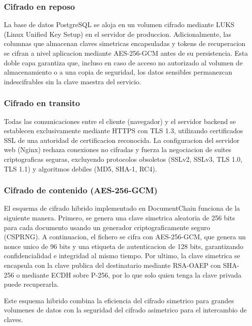 \documentclass[11pt, a4paper]{article}
\begin{document}
\subsubsection{Cifrado en reposo}

La base de datos PostgreSQL se aloja en un volumen cifrado mediante LUKS (Linux Unified Key Setup) en el servidor de produccion. Adicionalmente, las columnas que almacenan claves simetricas encapsuladas y tokens de recuperacion se cifran a nivel aplicacion mediante AES-256-GCM antes de su persistencia. Esta doble capa garantiza que, incluso en caso de acceso no autorizado al volumen de almacenamiento o a una copia de seguridad, los datos sensibles permanezcan indescifrables sin la clave maestra del servicio.

\subsubsection{Cifrado en transito}

Todas las comunicaciones entre el cliente (navegador) y el servidor backend se establecen exclusivamente mediante HTTPS con TLS 1.3, utilizando certificados SSL de una autoridad de certificacion reconocida. La configuracion del servidor web (Nginx) rechaza conexiones no cifradas y fuerza la negociacion de suites criptograficas seguras, excluyendo protocolos obsoletos (SSLv2, SSLv3, TLS 1.0, TLS 1.1) y algoritmos debiles (MD5, SHA-1, RC4).

\subsubsection{Cifrado de contenido (AES-256-GCM)}

El esquema de cifrado hibrido implementado en DocumentChain funciona de la siguiente manera. Primero, se genera una clave simetrica aleatoria de 256 bits para cada documento usando un generador criptograficamente seguro (CSPRNG). A continuacion, el fichero se cifra con AES-256-GCM, que genera un nonce unico de 96 bits y una etiqueta de autenticacion de 128 bits, garantizando confidencialidad e integridad al mismo tiempo. Por ultimo, la clave simetrica se encapsula con la clave publica del destinatario mediante RSA-OAEP con SHA-256 o mediante ECDH sobre P-256, por lo que solo quien tenga la clave privada puede recuperarla.

Este esquema hibrido combina la eficiencia del cifrado simetrico para grandes volumenes de datos con la seguridad del cifrado asimetrico para el intercambio de claves.
\end{document}
